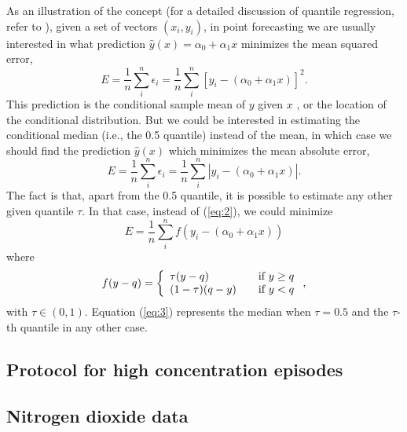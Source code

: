 \documentclass[a4paper,twocolumn,5p]{elsarticle}
\begin{document}
As an illustration of the concept (for a detailed discussion of
quantile regression, refer to \cite{koenker_quantile_2005}), given a
set of vectors $(x_i, y_i)$, in point forecasting we are usually
interested in what prediction $\hat y(x) = \alpha_0 + \alpha_1 x$
minimizes the mean squared error,
\begin{equation}
  \label{eq:1}
  E = \frac{1}{n} \sum^n_i \epsilon_i =
  \frac{1}{n} \sum^n_i [ y_i - (\alpha_0 + \alpha_1 x) ]^2.
\end{equation}
This prediction is the conditional sample mean of $y$ given $x$%
, or the location of the conditional distribution. But we could be
interested in estimating the conditional median (i.e., the 0.5
quantile) instead of the mean, in which case we should find the
prediction $\hat y(x)$ which minimizes the mean absolute error,
\begin{equation}
  \label{eq:2}
  E = \frac{1}{n} \sum^n_i \epsilon_i =
  \frac{1}{n} \sum^n_i | y_i - (\alpha_0 + \alpha_1 x) |.
\end{equation}
The fact is that, apart from the 0.5 quantile, it is possible to
estimate any other given quantile $\tau$. In that case, instead of
(\ref{eq:2}), we could minimize
\begin{equation}
  \label{eq:3}
E= \frac{1}{n} \sum^n_i f( y_i - (\alpha_0 + \alpha_1 x))
\end{equation}
where
\begin{equation}
  \label{eq:4}
  f(y-q) = \left\{ 
\begin{array}{l l}
\tau (y-q) & \quad \mbox{if $y \ge q$}\\
(1-\tau) (q-y) & \quad \mbox{if $y < q$}\\
\end{array} \right.,
\end{equation}
with $\tau \in (0,1)$. Equation (\ref{eq:3}) represents the
median when $\tau=0.5$ and the $\tau$-th quantile in any other case.


\label{sec:mm}

\subsection{Protocol for high \no concentration episodes}
\label{sec:madr-prot-high}


\subsection{Nitrogen dioxide data}
\label{sec:no2}
\end{document}
